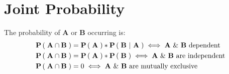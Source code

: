 \documentclass{article}
\newcommand{\Parens}[1]{\ensuremath{\left(\;#1\;\right)}\xspace}
\newcommand{\Prob}[1]{\ensuremath{\mathbf{P}\Parens{#1}}\xspace}
\newcommand{\RandVar}[1]{\ensuremath{\mathbf{#1}}\xspace}
\begin{document}
\section*{Joint Probability}
The probability of \RandVar{A} or \RandVar{B} occurring is:
\begin{align*}
\Prob{\RandVar{A} \cap \RandVar{B}} &= \Prob{\RandVar{A}} * \Prob{\RandVar{B}~|~\RandVar{A}} \hfill\iff \RandVar{A}~\&~\RandVar{B} \text{~dependent} \\
\Prob{\RandVar{A} \cap \RandVar{B}} &= \Prob{\RandVar{A}} * \Prob{\RandVar{B}} \hfill\iff \RandVar{A}~\&~\RandVar{B} \text{~are independent} \\
\Prob{\RandVar{A} \cap \RandVar{B}} &= 0 \hfill\iff \RandVar{A}~\&~\RandVar{B} \text{~are mutually exclusive} \\
\end{align*}
\end{document}
